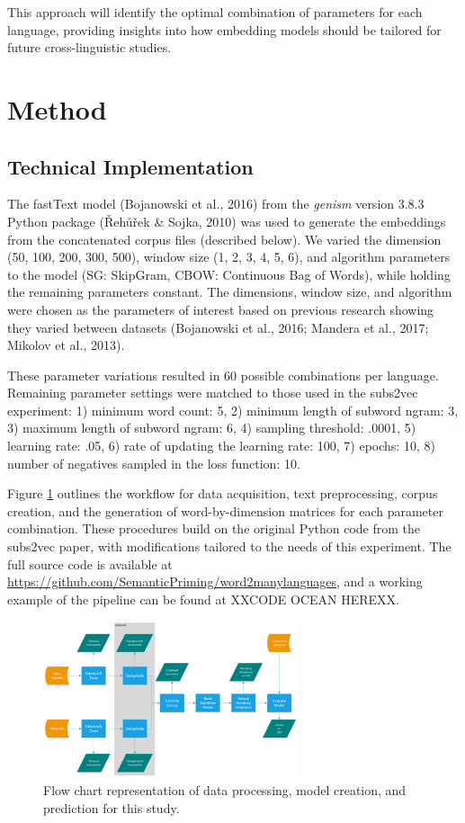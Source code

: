 \documentclass[
  man]{apa6}
\begin{document}
This approach will identify the optimal combination of parameters for each language, providing insights into how embedding models should be tailored for future cross-linguistic studies.

\section{Method}\label{method}

\subsection{Technical Implementation}\label{technical-implementation}

The fastText model (Bojanowski et al., 2016) from the \emph{genism} version 3.8.3 Python package (Řehůřek \& Sojka, 2010) was used to generate the embeddings from the concatenated corpus files (described below). We varied the dimension (50, 100, 200, 300, 500), window size (1, 2, 3, 4, 5, 6), and algorithm parameters to the model (SG: SkipGram, CBOW: Continuous Bag of Words), while holding the remaining parameters constant. The dimensions, window size, and algorithm were chosen as the parameters of interest based on previous research showing they varied between datasets (Bojanowski et al., 2016; Mandera et al., 2017; Mikolov et al., 2013).

These parameter variations resulted in 60 possible combinations per language. Remaining parameter settings were matched to those used in the subs2vec experiment: 1) minimum word count: 5, 2) minimum length of subword ngram: 3, 3) maximum length of subword ngram: 6, 4) sampling threshold: .0001, 5) learning rate: .05, 6) rate of updating the learning rate: 100, 7) epochs: 10, 8) number of negatives sampled in the loss function: 10.

Figure \ref{fig:tech-details} outlines the workflow for data acquisition, text preprocessing, corpus creation, and the generation of word-by-dimension matrices for each parameter combination. These procedures build on the original Python code from the subs2vec paper, with modifications tailored to the needs of this experiment. The full source code is available at \url{https://github.com/SemanticPriming/word2manylanguages}, and a working example of the pipeline can be found at XXCODE OCEAN HEREXX.

\begin{figure}
\includegraphics[width=2.96in]{figures/process_flow} \caption{Flow chart representation of data processing, model creation, and prediction for this study.}\label{fig:tech-details}
\end{figure}
\end{document}
